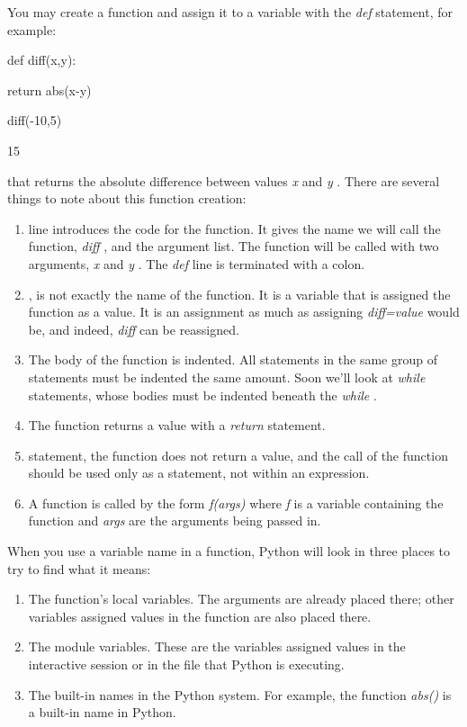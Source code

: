You may create a function and
assign it to a variable with the \emph{def} statement, for example:


def diff(x,y):

 return abs(x-y)




diff(-10,5)

15

 that
returns the absolute difference between values \emph{x} and \emph{y} .
There are several things to note about this function creation:

\begin{enumerate}
\tightlist
\item
   line introduces
  the code for the function. It gives the name we will call the
  function, \emph{diff} , and the argument list. The function will be
  called with two arguments, \emph{x} and \emph{y} . The \emph{def} line
  is terminated with a colon.
\item
   , is not
  exactly the name of the function. It is a variable that is assigned
  the function as a value. It is an assignment as much as assigning
  \emph{diff=value} would be, and indeed, \emph{diff} can be reassigned.
\item
  The body of the function is
  indented. All statements in the same group of statements must be
  indented the same amount. Soon we'll look at \emph{while} statements,
  whose bodies must be indented beneath the \emph{while} .
\item
  The function returns a value with
  a \emph{return} statement.
\item
  
  statement, the function does not return a value, and the call of the
  function should be used only as a statement, not within an expression.
\item
  A function is called by the form
  \emph{f(args)} where \emph{f} is a variable containing the function
  and \emph{args} are the arguments being passed in.
\end{enumerate}

When you use a variable name in a
function, Python will look in three places to try to find what it means:

\begin{enumerate}
\tightlist
\item
  The function's local variables.
  The arguments are already placed there; other variables assigned
  values in the function are also placed there.
\item
  The module variables. These are
  the variables assigned values in the interactive session or in the
  file that Python is executing.
\item
  The built-in names in the Python
  system. For example, the function \emph{abs()} is a built-in name in
  Python.
\end{enumerate}


